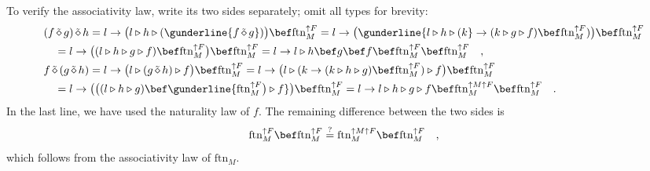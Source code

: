 To verify the associativity law, write its two sides separately; omit
all types for brevity:
\begin{align*}
 & (f\,\tilde{\diamond}\,g)\,\tilde{\diamond}\,h=l\rightarrow\big(l\triangleright h\triangleright(\gunderline{f\,\tilde{\diamond}\,g})\big)\bef\text{ftn}_{M}^{\uparrow F}=l\rightarrow\big(\gunderline{l\triangleright h\triangleright(k}\rightarrow(k\triangleright g\triangleright f)\bef\text{ftn}_{M}^{\uparrow F})\big)\bef\text{ftn}_{M}^{\uparrow F}\\
 & \quad=l\rightarrow\big((l\triangleright h\triangleright g\triangleright f)\bef\text{ftn}_{M}^{\uparrow F}\big)\bef\text{ftn}_{M}^{\uparrow F}=l\rightarrow l\triangleright h\bef g\bef f\bef\text{ftn}_{M}^{\uparrow F}\bef\text{ftn}_{M}^{\uparrow F}\quad,\\
 & f\,\tilde{\diamond}\,(g\,\tilde{\diamond}\,h)=l\rightarrow\big(l\triangleright(g\,\tilde{\diamond}\,h)\triangleright f\big)\bef\text{ftn}_{M}^{\uparrow F}=l\rightarrow\big(l\triangleright(k\rightarrow(k\triangleright h\triangleright g)\bef\text{ftn}_{M}^{\uparrow F})\triangleright f\big)\bef\text{ftn}_{M}^{\uparrow F}\\
 & \quad=l\rightarrow\big(\big((l\triangleright h\triangleright g)\bef\gunderline{\text{ftn}_{M}^{\uparrow F}\big)\triangleright f}\big)\bef\text{ftn}_{M}^{\uparrow F}=l\rightarrow l\triangleright h\triangleright g\triangleright f\bef\text{ftn}_{M}^{\uparrow M\uparrow F}\bef\text{ftn}_{M}^{\uparrow F}\quad.
\end{align*}
In the last line, we have used the naturality law of $f$. The remaining
difference between the two sides is
\[
\text{ftn}_{M}^{\uparrow F}\bef\text{ftn}_{M}^{\uparrow F}\overset{?}{=}\text{ftn}_{M}^{\uparrow M\uparrow F}\bef\text{ftn}_{M}^{\uparrow F}\quad,
\]
which follows from the associativity law of $\text{ftn}_{M}$.

